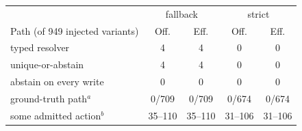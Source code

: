 \begin{tabular}{lcccc}
\toprule
& \multicolumn{2}{c}{fallback} & \multicolumn{2}{c}{strict} \\
Path (of 949 injected variants) & Off. & Eff. & Off. & Eff. \\
\midrule
typed resolver & 4 & 4 & 0 & 0 \\
unique-or-abstain & 4 & 4 & 0 & 0 \\
abstain on every write & 0 & 0 & 0 & 0 \\
ground-truth path$^a$ & 0/709 & 0/709 & 0/674 & 0/674 \\
some admitted action$^b$ & 35--110 & 35--110 & 31--106 & 31--106 \\
\bottomrule
\end{tabular}
